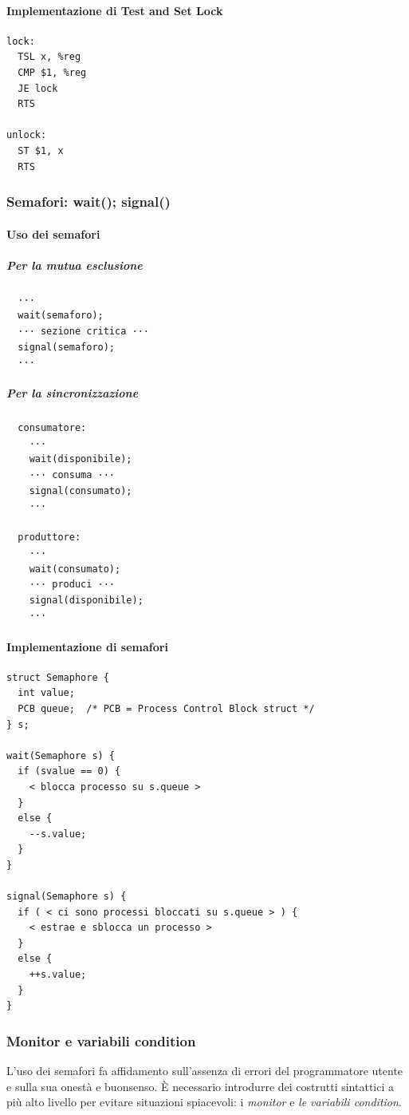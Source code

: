 \documentclass[12pt,a4paper]{article}
\begin{document}
\paragraph{Implementazione di Test and Set Lock}
\begin{verbatim}
lock:
  TSL x, %reg
  CMP $1, %reg
  JE lock
  RTS

unlock:
  ST $1, x
  RTS
\end{verbatim}

\subsubsection{Semafori: wait(); signal()}
\paragraph{Uso dei semafori}
\subparagraph{Per la mutua esclusione}
\begin{verbatim}
  ···
  wait(semaforo);
  ··· sezione critica ···
  signal(semaforo);
  ···
\end{verbatim}

\subparagraph{Per la sincronizzazione}
\begin{verbatim}
  consumatore:
    ···
    wait(disponibile);
    ··· consuma ···
    signal(consumato);
    ···

  produttore:
    ···
    wait(consumato);
    ··· produci ···
    signal(disponibile);
    ···
\end{verbatim}

\paragraph{Implementazione di semafori}
\begin{verbatim}
struct Semaphore {
  int value;
  PCB queue;  /* PCB = Process Control Block struct */
} s;

wait(Semaphore s) {
  if (svalue == 0) {
    < blocca processo su s.queue >
  }
  else {
    --s.value;
  }
}

signal(Semaphore s) {
  if ( < ci sono processi bloccati su s.queue > ) {
    < estrae e sblocca un processo >
  }
  else {
    ++s.value;
  }
}
\end{verbatim}

\subsubsection{Monitor e variabili condition}
L'uso dei semafori fa affidamento sull'assenza di errori del programmatore
utente e sulla sua onestà e buonsenso. È necessario introdurre dei costrutti
sintattici a più alto livello per evitare situazioni spiacevoli: i \emph{monitor}
e \emph{le variabili condition}. \cite[223]{silberschatz:osc}
\end{document}
